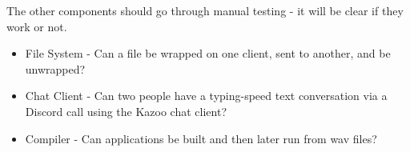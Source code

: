 \documentclass[]{article}
\begin{document}
The other components should go through manual testing - it will be clear if they work or not.

\begin{itemize}
  \item File System - Can a file be wrapped on one client, sent to another, and be unwrapped?
  \item Chat Client - Can two people have a typing-speed text conversation via a Discord call using the Kazoo chat client?
  \item Compiler - Can applications be built and then later run from wav files?
\end{itemize}
\end{document}
